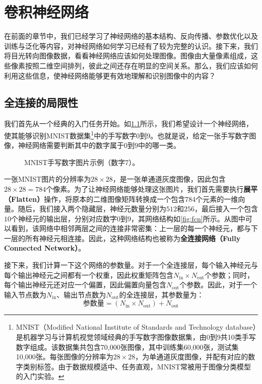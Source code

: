 
\chapter{卷积神经网络}

在前面的章节中，我们已经学习了神经网络的基本结构、反向传播、参数优化以及训练与泛化等内容，对神经网络如何学习已经有了较为完整的认识。接下来，我们将目光转向图像数据，看看神经网络应该如何处理图像。图像由大量像素组成，这些像素按照二维空间排列，彼此之间还存在明显的空间关系。那么，我们应该如何利用这些信息，使神经网络能够更有效地理解和识别图像中的内容？

\section{全连接的局限性}

我们首先从一个经典的入门任务开始。如\cref{fig:mnist_7}所示，我们希望设计一个神经网络，使其能够识别MNIST数据集\footnote{MNIST（Modified National Institute of Standards and Technology database）是机器学习与计算机视觉领域经典的手写数字图像数据集，由$0$到$9$共10类手写数字组成。该数据集共包含70,000张图像，其中训练集60,000张，测试集10,000张。每张图像的分辨率为$28\times28$，为单通道灰度图像，并配有对应的数字类别标签。由于数据规模适中、任务直观，MNIST常被用于图像分类模型的入门实验。}中的手写数字$0$到$9$。也就是说，给定一张手写数字图像，神经网络需要判断其中的数字属于$0$到$9$中的哪一类。

\begin{figure}[H]
    \caption{MNIST手写数字图片示例（数字7）。}
    \label{fig:mnist_7}
\end{figure}

一张MNIST图片的分辨率为$28\times28$，是一张单通道灰度图像，因此包含$28\times28=784$个像素。为了让神经网络能够处理这张图片，我们首先需要执行\textbf{展平（Flatten）}操作，将原本的二维图像矩阵转换成一个包含$784$个元素的一维向量。随后，我们接入两个隐藏层，神经元数量分别为$512$和$256$，最后接入一个包含$10$个神经元的输出层，分别对应数字$0$到$9$，其网络结构如\cref{fig:fcn}所示。从图中可以看到，该网络中相邻两层之间的连接非常密集：上一层的每一个神经元，都与下一层的所有神经元相连接。因此，这种网络结构也被称为\textbf{全连接网络（Fully Connected Network）}。

接下来，我们计算一下这个网络的参数量。对于一个全连接层，每个输入神经元与每个输出神经元之间都有一个权重，因此权重矩阵包含$N_{\text{in}}\times N_{\text{out}}$个参数；同时，每个输出神经元还对应一个偏置，因此偏置向量包含$N_{\text{out}}$个参数。因此，对于一个输入节点数为$N_{\text{in}}$、输出节点数为$N_{\text{out}}$的全连接层，其参数量为：
$$
\text{参数量} = (N_{\text{in}} \times N_{\text{out}}) + N_{\text{out}}
$$

